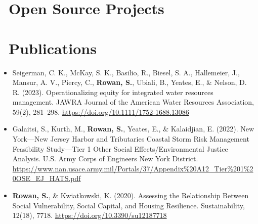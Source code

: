 \documentclass[11pt,a4paper,]{sr-awesome-cv}
\begin{document}
\hypertarget{open-source-projects}{%
\section{\faGithub~Open Source Projects}\label{open-source-projects}}

\begin{cventries}
\end{cventries}

\hypertarget{publications}{%
\section{\faFileText~Publications}\label{publications}}

\footnotesize

\begin{itemize}
\item
  Seigerman, C. K., McKay, S. K., Basilio, R., Biesel, S. A.,
  Hallemeier, J., Mansur, A. V., Piercy, C., \textbf{Rowan, S.}, Ubiali,
  B., Yeates, E., \& Nelson, D. R. (2023). Operationalizing equity for
  integrated water resources management. JAWRA Journal of the American
  Water Resources Association, 59(2), 281--298.
  \url{https://doi.org/10.1111/1752-1688.13086}
\item
  Galaitsi, S., Kurth, M., \textbf{Rowan, S.}, Yeates, E., \&
  Kalaidjian, E. (2022). New York---New Jersey Harbor and Tributaries
  Coastal Storm Risk Management Feasibility Study---Tier 1 Other Social
  Effects/Environmental Justice Analysis. U.S. Army Corps of Engineers
  New York District.
  \url{https://www.nan.usace.army.mil/Portals/37/Appendix\%20A12_Tier\%201\%20OSE_EJ_HATS.pdf}
\item
  \textbf{Rowan, S.}, \& Kwiatkowski, K. (2020). Assessing the
  Relationship Between Social Vulnerability, Social Capital, and Housing
  Resilience. Sustainability, 12(18), 7718.
  \url{https://doi.org/10.3390/su12187718}
\end{itemize}
\end{document}

